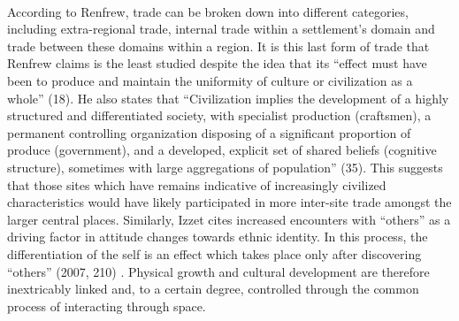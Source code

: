 \documentclass[12pt,a4paper]{thesis}
\begin{document}
\paragraph{}	
According to Renfrew, trade can be broken down into different categories,  including extra-regional trade, internal trade within a settlement's domain and trade between these domains within a region.  It is this last form of trade that Renfrew claims is the least studied despite the idea that its ``effect must have been to produce and maintain the uniformity of culture or civilization as a whole'' (18). He also states that ``Civilization implies the development of a highly structured and differentiated society, with specialist production (craftsmen), a permanent controlling organization disposing of a significant proportion of produce (government), and a developed, explicit set of shared beliefs (cognitive structure), sometimes with large aggregations of population'' (35). This suggests that those sites which have remains indicative of increasingly civilized characteristics would have likely participated in more inter-site trade amongst the larger central places. Similarly, Izzet cites increased encounters with ``others'' as a driving factor in attitude changes towards ethnic identity. In this process, the differentiation of the self is an effect which takes place only after  discovering ``others'' (2007, 210) . Physical growth and cultural development are therefore inextricably linked and, to a certain degree, controlled through the common process of interacting through space. 
\end{document}
